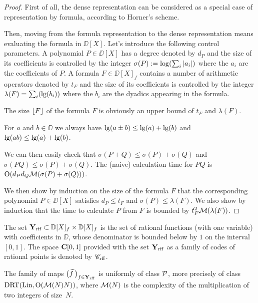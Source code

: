 \begin{proof} First of all, the dense representation can be considered as a special case of representation by formula, according to Horner's scheme.

\noindent 
 Then, moving from the formula representation to the dense representation means evaluating the formula in $\DD[X]$. Let's introduce the following control parameters. A polynomial $P \in \DD[X]$ has a degree denoted by $d_P$ and the size of its coefficients is controlled by the integer $\sigma(P) := \log(\sum_i \left|{a_i}\right|)$ where the $a_i$ are the coefficients of $P$. A formula $F \in \DD[X]_f$ contains a number of arithmetic operators denoted by $t_F$ and the size of its coefficients is controlled by the integer $\lambda(F) = \sum_i ({\rm lg}(b_i))$ where the $b_i$ are the dyadics appearing in the formula.

\noindent 
The size $\lfloor F \rfloor$ of the formula $F$ is obviously an upper bound of $t_F$ and $\lambda (F)$.

\noindent 
For  $a$ and $b\in\DD$ we always have ${\rm lg}(a \pm b) \leq {\rm lg}(a) + {\rm lg}(b)$ and $ {\rm lg}(ab) \leq {\rm lg}(a)+ {\rm lg}(b)$.

\noindent 
We can then easily check that $\sigma (P \pm Q) \leq \sigma(P) + \sigma(Q)$ and $\sigma (PQ) \leq \sigma (P) + \sigma (Q)$. The (naive) calculation time for $PQ$ is ${\rm O}(d_Pd_Q {\cal M}(\sigma(P) + \sigma(Q)))$.

\noindent 
We then show by induction on the size of the formula $F$ that the corresponding polynomial $P \in \DD[X]$ satisfies $d_P \leq t_F$ and $\sigma (P) \leq \lambda (F)$. We also show by induction that the time to calculate $P$ from $F$ is bounded by $t_F^2{ \cal M}(\lambda(F))$. 
 \end{proof}


\begin{definition}\label{325}
The set ${{\bf Y}_{\rm rff}} \subset \mathbb {D}[X]_f \times \mathbb {D}[X]_f$ is the set of rational functions (with one variable) with coefficients in $\DD$, whose denominator is bounded below by $1$ on the interval $[0,1]$. The space ${{\bf C}[0,1]}$ provided with the set ${{\bf Y}_{\rm rff}}$ as a family of codes of rational points is denoted by ${{{\mathscr C}}_{\rm rff}}$.
\end{definition} 

\begin{proposition} \label{326}  
The family of maps $\big(\widetilde{f}\,\big)_{f \in {{\bf Y}_{\rm rff}} }$ is uniformly of class ${\cal P}$, more precisely of class ${\rm DRT}({\rm Lin}, {\rm O}({{{\cal M}}}(N)N))$, where ${{\cal M}}(N)$ is the complexity of the multiplication of two integers of size~$N$.
\end{proposition}

